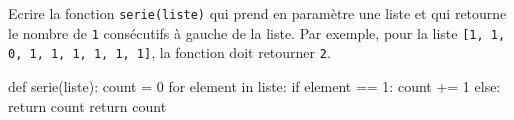 \documentclass[11pt, a4paper]{report}
\begin{document}
        
\begin{minipage}{0.45\linewidth}
           \begin{exercice_cours}

Ecrire la fonction \texttt{serie(liste)} qui prend en paramètre une liste et qui retourne le nombre de \texttt{1} consécutifs à gauche de la liste. Par exemple, pour la liste \texttt{[1, 1, 0, 1, 1, 1, 1, 1, 1]}, la fonction doit retourner \texttt{2}. 
    \end{exercice_cours}

    \end{minipage}\hfill
    \begin{minipage}{0.53\linewidth}
\begin{blocvisible}[height=5]
    \begin{CodePythontexAlt}[TaillePolice=\large, Largeur=1\linewidth,Centre,Lignes=true,PremLigne=1]{}
def serie(liste):
    count = 0
    for element in liste:
        if element == 1:
            count += 1
        else:
            return count
    return count
    
    \end{CodePythontexAlt}
\end{blocvisible}

    \end{minipage}
\end{document}
